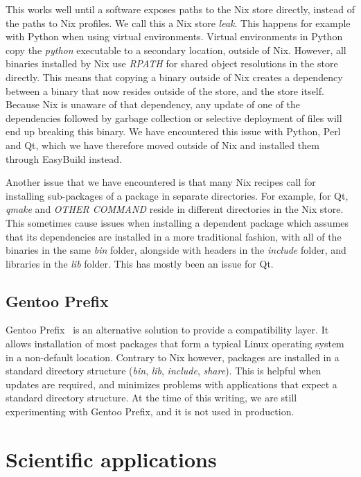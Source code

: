 \documentclass[sigconf]{acmart}
\begin{document}
This works well until a software exposes paths to the Nix store directly, instead of the paths to Nix profiles. We call this a Nix store {\it leak}. This happens for example with Python when using virtual environments. Virtual environments in Python copy the {\it python} executable to a secondary location, outside of Nix. However, all binaries installed by Nix use {\it RPATH} for shared object resolutions in the store directly. This means that copying a binary outside of Nix creates a dependency between a binary that now resides outside of the store, and the store itself. Because Nix is unaware of that dependency, any update of one of the dependencies followed by garbage collection or selective deployment of files will end up breaking this binary. We have encountered this issue with Python, Perl and Qt, which we have therefore moved outside of Nix and installed them through EasyBuild instead.

Another issue that we have encountered is that many Nix recipes call for installing sub-packages of a package in separate directories. For example, for Qt, {\it qmake} and {\it OTHER COMMAND} reside in different directories in the Nix store. This sometimes cause issues when installing a dependent package which assumes that its dependencies are installed in a more traditional fashion, with all of the binaries in the same {\it bin} folder, alongside with headers in the {\it include} folder, and libraries in the {\it lib} folder. This has mostly been an issue for Qt. 


\subsection{Gentoo Prefix}
\label{sub:Gentoo_Prefix}
Gentoo Prefix~\cite{Gentoo} is an alternative solution to provide a compatibility layer. It allows installation of most packages that form a typical Linux operating system in a non-default location. Contrary to Nix however, packages are installed in a standard directory structure ({\it bin}, {\it lib}, {\it include}, {\it share}). This is helpful when updates are required, and minimizes problems with applications that expect a standard directory structure. At the time of this writing, we are still experimenting with Gentoo Prefix, and it is not used in production. 

\section{Scientific applications}
\label{sec:Scientific_applications}
\end{document}
